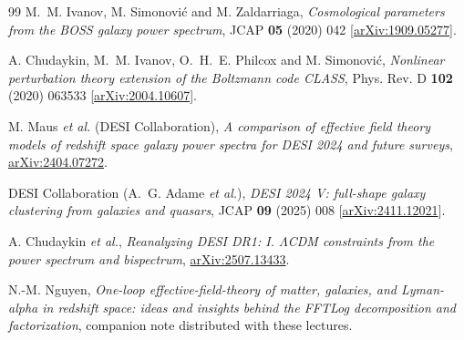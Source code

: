 \documentclass[a4paper,11pt]{article}
\numberwithin{equation}{section}
\begin{document}
\begin{thebibliography}{99}
M.~M. Ivanov, M. Simonovi\'c and M. Zaldarriaga,
\emph{Cosmological parameters from the BOSS galaxy power spectrum},
JCAP \textbf{05} (2020) 042
[\href{https://arxiv.org/abs/1909.05277}{arXiv:1909.05277}].

A. Chudaykin, M.~M. Ivanov, O.~H.~E. Philcox and M. Simonovi\'c,
\emph{Nonlinear perturbation theory extension of the Boltzmann code CLASS},
Phys. Rev. D \textbf{102} (2020) 063533
[\href{https://arxiv.org/abs/2004.10607}{arXiv:2004.10607}].

M. Maus \emph{et al.} (DESI Collaboration),
\emph{A comparison of effective field theory models of redshift space galaxy power spectra for DESI 2024 and future surveys},
\href{https://arxiv.org/abs/2404.07272}{arXiv:2404.07272}.

DESI Collaboration (A.~G. Adame \emph{et al.}),
\emph{DESI 2024 V: full-shape galaxy clustering from galaxies and quasars},
JCAP \textbf{09} (2025) 008
[\href{https://arxiv.org/abs/2411.12021}{arXiv:2411.12021}].

A. Chudaykin \emph{et al.},
\emph{Reanalyzing DESI DR1: I. $\Lambda$CDM constraints from the power spectrum and bispectrum},
\href{https://arxiv.org/abs/2507.13433}{arXiv:2507.13433}.

N.-M. Nguyen,
\emph{One-loop effective-field-theory of matter, galaxies, and Lyman-alpha in redshift space: ideas and insights behind the FFTLog decomposition and factorization},
companion note distributed with these lectures.

\end{thebibliography}
\end{document}
